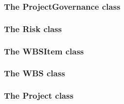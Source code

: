 \subsubsection{The ProjectGovernance class}



\subsubsection{The Risk class}


\subsubsection{The WBSItem class}


\subsubsection{The WBS class}


\subsubsection{The Project class}
